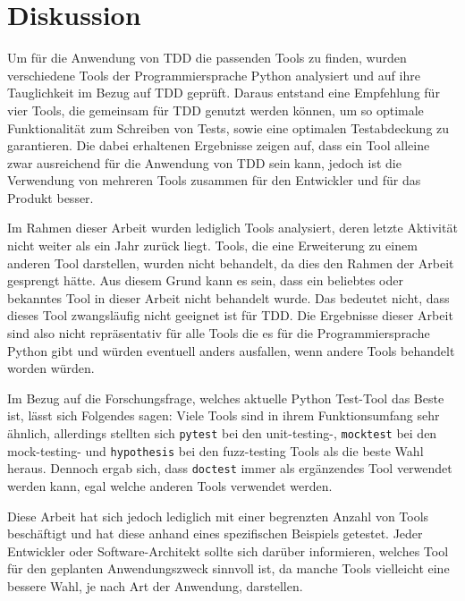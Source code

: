 \section{Diskussion}\label{diskussion}
Um für die Anwendung von TDD die passenden Tools zu finden, wurden verschiedene
Tools der Programmiersprache Python analysiert und auf ihre Tauglichkeit im
Bezug auf TDD geprüft. Daraus entstand eine Empfehlung für vier Tools, die
gemeinsam für TDD genutzt werden können, um so optimale Funktionalität zum
Schreiben von Tests, sowie eine optimalen Testabdeckung zu garantieren. Die 
dabei erhaltenen Ergebnisse zeigen auf, dass ein Tool alleine zwar ausreichend 
für die Anwendung von TDD sein kann, jedoch ist die Verwendung von mehreren 
Tools zusammen für den Entwickler und für das Produkt besser.

Im Rahmen dieser Arbeit wurden lediglich Tools analysiert, deren letzte
Aktivität nicht weiter als ein Jahr zurück liegt. Tools, die eine Erweiterung zu
einem anderen Tool darstellen, wurden nicht behandelt, da dies den Rahmen der
Arbeit gesprengt hätte. Aus diesem Grund kann es sein, dass ein beliebtes oder
bekanntes Tool in dieser Arbeit nicht behandelt wurde. Das bedeutet nicht, dass
dieses Tool zwangsläufig nicht geeignet ist für TDD. Die Ergebnisse dieser
Arbeit sind also nicht repräsentativ für alle Tools die es für die
Programmiersprache Python gibt und würden eventuell anders ausfallen, wenn
andere Tools behandelt worden würden.

Im Bezug auf die Forschungsfrage, welches aktuelle Python Test-Tool das Beste 
ist, lässt sich Folgendes sagen: Viele Tools sind in ihrem Funktionsumfang sehr 
ähnlich, allerdings stellten sich \lstinline{pytest} bei den unit-testing-, 
\lstinline{mocktest} bei den mock-testing- und \lstinline{hypothesis} bei den 
fuzz-testing Tools als die beste Wahl heraus. Dennoch ergab sich, dass 
\lstinline{doctest} immer als ergänzendes Tool verwendet werden kann, egal 
welche anderen Tools verwendet werden.

Diese Arbeit hat sich jedoch lediglich mit einer begrenzten Anzahl von Tools 
beschäftigt und hat diese anhand eines spezifischen Beispiels getestet. Jeder 
Entwickler oder Software-Architekt sollte sich darüber informieren, welches 
Tool für den geplanten Anwendungszweck sinnvoll ist, da manche Tools 
vielleicht eine bessere Wahl, je nach Art der Anwendung, darstellen.